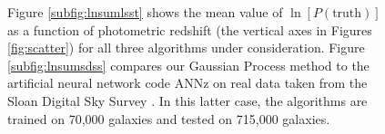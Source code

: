 \documentclass[useAMS,usenatbib,tightenlines,11pt,preprint]{aastex}
\begin{document}
\begin{figure}
\caption{
Figure \ref{subfig:lnsumlsst} shows the mean value of
$\ln[P(\text{truth})]$ as a function of photometric redshift (the vertical
axes in Figures \ref{fig:scatter}) for all
three algorithms under consideration.  
Figure \ref{subfig:lnsumsdss} compares our Gaussian Process method
to the artificial neural network code ANNz \cite{annz} on real
data taken from the Sloan Digital Sky Survey \cite{Abazajian:2008wr}.  
In this latter case, the
algorithms are trained on 70,000 galaxies and tested on 715,000 galaxies.
}
\label{fig:gp}
\end{figure}
\end{document}
